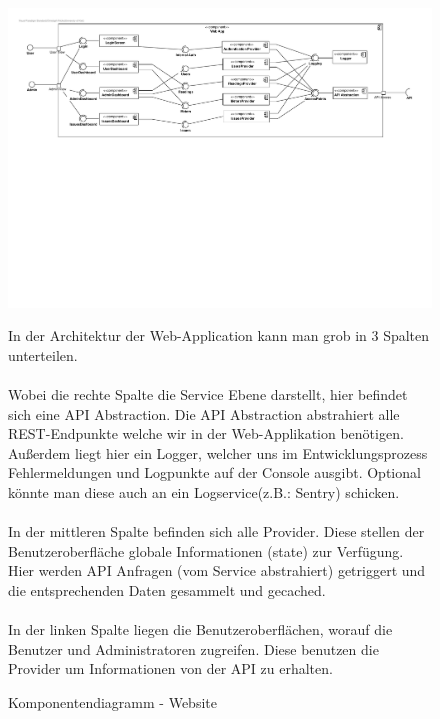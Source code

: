 
\begin{figure}[h]
	\hspace{-3cm}
	\includegraphics[scale = 0.6]{./img/Diagrams/Website-Components} 	
	\caption{Komponentendiagramm - Website} 

In der Architektur der Web-Application kann man grob in 3 Spalten unterteilen. 
\\ \\
Wobei die rechte Spalte die Service Ebene darstellt, hier befindet sich eine API Abstraction. Die API Abstraction abstrahiert alle REST-Endpunkte welche wir in der Web-Applikation benötigen. Außerdem liegt hier ein Logger, welcher uns im Entwicklungsprozess Fehlermeldungen und Logpunkte auf der Console ausgibt. Optional könnte man diese auch an ein Logservice(z.B.: Sentry) schicken.
\\ \\
In der mittleren Spalte befinden sich alle Provider. Diese stellen der Benutzeroberfläche globale Informationen (state) zur Verfügung. Hier werden API Anfragen (vom Service abstrahiert) getriggert und die entsprechenden Daten gesammelt und gecached.
\\ \\
In der linken Spalte liegen die Benutzeroberflächen, worauf die Benutzer und Administratoren zugreifen. Diese benutzen die Provider um Informationen von der API zu erhalten. 



\end{figure}
